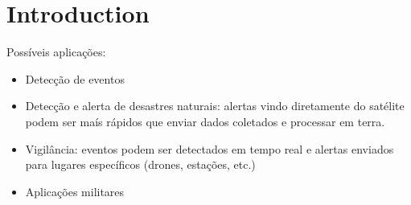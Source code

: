 %
%
%
%
%

%
%
%
%
%

\section{Introduction} \label{sec:introduction}


Possíveis aplicações:

\begin{itemize}
    \item Detecção de eventos
    \item Detecção e alerta de desastres naturais: alertas vindo diretamente do satélite podem ser maís rápidos que enviar dados coletados e processar em terra.
    \item Vigilância: eventos podem ser detectados em tempo real e alertas enviados para lugares específicos (drones, estações, etc.)
    \item Aplicações militares
\end{itemize}
